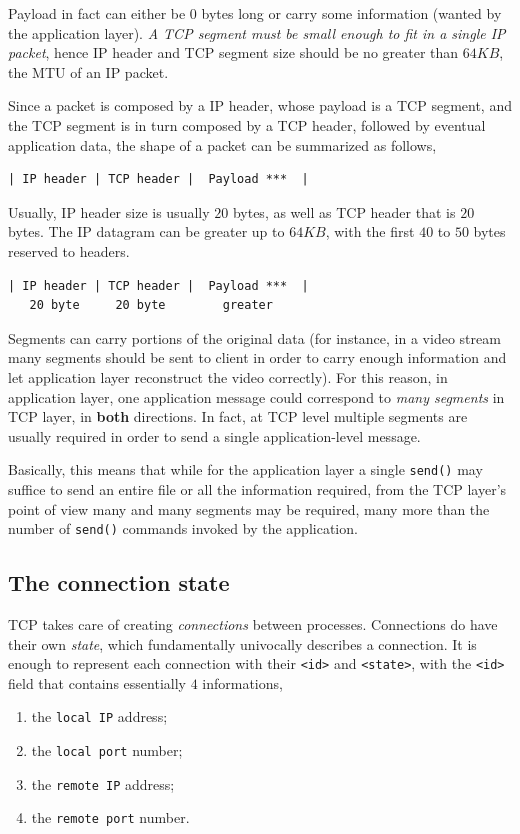 \documentclass[10pt]{book}
\begin{document}
Payload in fact can either be $0$ bytes long or carry some information (wanted by the
application layer). \emph{A TCP segment must be
small enough to fit in a single IP packet}, hence IP header and TCP segment
size should be no greater than $64KB$, the MTU of an IP packet.

Since a packet is composed by a IP header, whose payload is a TCP segment, and the
TCP segment is in turn composed by a TCP header, followed by eventual
application data, the shape of a packet can be summarized as follows,

\begin{verbatim}
| IP header | TCP header |  Payload ***  |
\end{verbatim}

Usually, IP header size is usually $20$ bytes, as well as TCP
header that is $20$ bytes. The IP datagram can be greater up to $64KB$, with
the first $40$ to $50$ bytes reserved to headers.

\begin{verbatim}
| IP header | TCP header |  Payload ***  |
   20 byte     20 byte        greater
\end{verbatim}

Segments can carry portions of the original data (for instance, in a video
stream many segments should be sent to client in order to carry enough
information and let application layer reconstruct the video correctly). For
this reason, in application layer, one application message could correspond to
\emph{many segments} in TCP layer, in \textbf{both} directions. In fact, at TCP
level multiple segments are usually required in order to send a single
application-level message.

Basically, this means that while for the application layer a single
\texttt{send()} may suffice to send an entire file or all the information
required, from the TCP layer's point of view many and many segments may be
required, many more than the number of \texttt{send()} commands invoked by the
application.

\subsection{The connection state}

TCP takes care of creating \emph{connections} between processes. Connections do
have their own \emph{state}, which fundamentally univocally describes a
connection. It is enough to represent each connection with their \texttt{<id>}
and \texttt{<state>}, with the \texttt{<id>} field that contains essentially
$4$ informations,
\begin{enumerate}
    \item the \texttt{local IP} address;
    \item the \texttt{local port} number;
    \item the \texttt{remote IP} address;
    \item the \texttt{remote port} number.
\end{enumerate}
\end{document}
